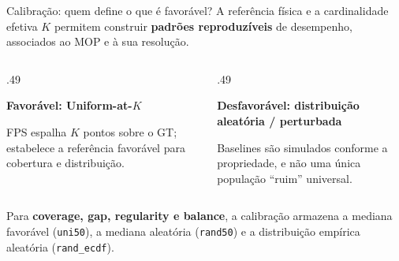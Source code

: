 \begin{frame}{Calibração: quem define o que é favorável?}
A referência física e a cardinalidade efetiva $K$ permitem construir \textbf{padrões reproduzíveis} de desempenho, associados ao MOP e à sua resolução.
\begin{columns}[T,onlytextwidth]
\begin{column}{.49\textwidth}\centering
{}
\textbf{Favorável: Uniform-at-$K$}\par
\scriptsize FPS espalha $K$ pontos sobre o GT; estabelece a referência favorável para cobertura e distribuição.
\end{column}
\begin{column}{.49\textwidth}\centering
{}
\textbf{Desfavorável: distribuição aleatória / perturbada}\par
\scriptsize Baselines são simulados conforme a propriedade, e não uma única população ``ruim'' universal.
\end{column}
\end{columns}
\vspace{.13cm}
Para \textbf{coverage, gap, regularity e balance}, a calibração armazena a mediana favorável (\texttt{uni50}), a mediana aleatória (\texttt{rand50}) e a distribuição empírica aleatória (\texttt{rand\_ecdf}).
\end{frame}

